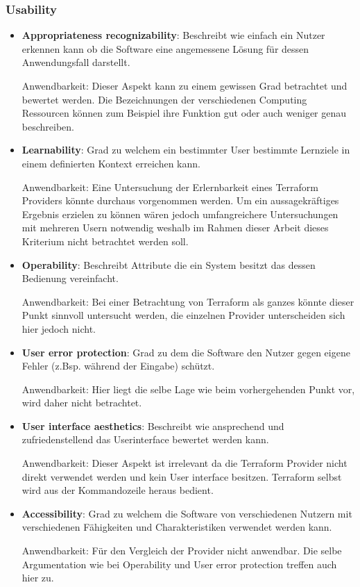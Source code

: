\subsubsection{Usability}

\begin{itemize}
  \item \textbf{Appropriateness recognizability}: Beschreibt wie einfach
  ein Nutzer erkennen kann ob die Software eine angemessene Lösung für
  dessen Anwendungsfall darstellt.

  Anwendbarkeit: Dieser Aspekt kann zu einem gewissen Grad betrachtet
  und bewertet werden. Die Bezeichnungen der verschiedenen Computing 
  Ressourcen können zum Beispiel ihre Funktion gut oder auch weniger
  genau beschreiben.

  \item \textbf{Learnability}: Grad zu welchem ein bestimmter User
  bestimmte Lernziele in einem definierten Kontext erreichen kann.

  Anwendbarkeit: Eine Untersuchung der Erlernbarkeit eines Terraform 
  Providers könnte durchaus vorgenommen werden. Um ein aussagekräftiges
  Ergebnis erzielen zu können wären jedoch umfangreichere Untersuchungen
  mit mehreren Usern notwendig weshalb im Rahmen dieser Arbeit dieses
  Kriterium nicht betrachtet werden soll.

  \item \textbf{Operability}: Beschreibt Attribute die ein System besitzt
  das dessen Bedienung vereinfacht.

  Anwendbarkeit: Bei einer Betrachtung von Terraform als ganzes könnte
  dieser Punkt sinnvoll untersucht werden, die einzelnen Provider
  unterscheiden sich hier jedoch nicht.

  \item \textbf{User error protection}: Grad zu dem die Software den
  Nutzer gegen eigene Fehler (z.Bsp. während der Eingabe) schützt.

  Anwendbarkeit: Hier liegt die selbe Lage wie beim vorhergehenden
  Punkt vor, wird daher nicht betrachtet.

  \item \textbf{User interface aesthetics}: Beschreibt wie ansprechend
  und zufriedenstellend das Userinterface bewertet werden kann.
  
  Anwendbarkeit: Dieser Aspekt ist irrelevant da die Terraform Provider
  nicht direkt verwendet werden und kein User interface besitzen.
  Terraform selbst wird aus der Kommandozeile heraus bedient.

  \item \textbf{Accessibility}: Grad zu welchem die Software von
  verschiedenen Nutzern mit verschiedenen Fähigkeiten und Charakteristiken
  verwendet werden kann.

  Anwendbarkeit: Für den Vergleich der Provider nicht anwendbar. Die 
  selbe Argumentation wie bei Operability und User error protection
  treffen auch hier zu. 
\end{itemize}

